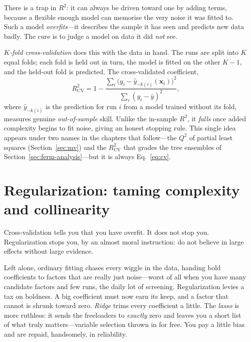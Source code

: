 There is a trap in $R^2$: it can always be driven toward one by adding terms,
because a flexible enough model can memorise the very noise it was fitted to.
Such a model \emph{overfits}---it describes the sample it has seen and predicts
new data badly. The cure is to judge a model on data it did \emph{not} see.

\emph{$K$-fold cross-validation} does this with the data in hand. The runs are
split into $K$ equal folds; each fold is held out in turn, the model is fitted
on the other $K-1$, and the held-out fold is predicted. The
cross-validated coefficient,
%
\begin{equation}
R^2_{\mathrm{CV}} = 1 - \frac{\sum_i\bigl(y_i-\hat y_{-k(i)}(\bm x_i)\bigr)^2}
                              {\sum_i (y_i-\bar y)^2},
\label{eq:cv}
\end{equation}
%
where $\hat y_{-k(i)}$ is the prediction for run $i$ from a model trained without
its fold, measures genuine \emph{out-of-sample} skill. Unlike the in-sample
$R^2$, it \emph{falls} once added complexity begins to fit noise, giving an
honest stopping rule. This single idea appears under two names in the chapters
that follow---the $Q^2$ of partial least squares (Section~\ref{sec:mv}) and the
$R^2_{\mathrm{CV}}$ that grades the tree ensembles of
Section~\ref{sec:ferm-analysis}---but it is always Eq.~\eqref{eq:cv}.

\section{Regularization: taming complexity and collinearity}
\label{sec:stats-reg}

Cross-validation tells you that you have overfit. It does not stop you.
Regularization stops you, by an almost moral instruction: do not believe in large
effects without large evidence.

Left alone, ordinary fitting chases every wiggle in the data, handing bold
coefficients to factors that are really just noise---worst of all when you have
many candidate factors and few runs, the daily lot of screening. Regularization
levies a tax on boldness. A big coefficient must now earn its keep, and a factor
that cannot is shrunk toward zero. \emph{Ridge} trims every coefficient a little.
The \emph{lasso} is more ruthless: it sends the freeloaders to \emph{exactly}
zero and leaves you a short list of what truly matters---variable selection
thrown in for free. You pay a little bias and are repaid, handsomely, in
reliability.

